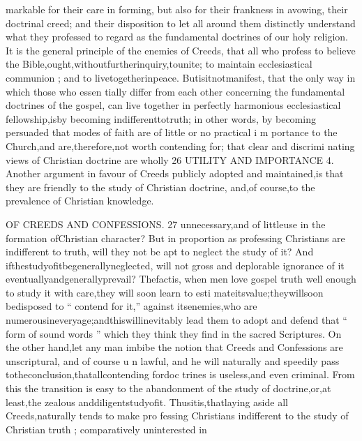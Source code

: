 \documentclass[
]{book}
\begin{document}
markable for their care in forming, but also for their frankness in avowing, their doctrinal creed; and their disposition to let all around
them distinctly understand what they professed to regard as the fundamental doctrines of our holy religion.
It is the general principle of the enemies of Creeds, that all who profess to believe the Bible,ought,withoutfurtherinquiry,tounite;
to maintain ecclesiastical communion ; and to
livetogetherinpeace. Butisitnotmanifest,
that the only way in which those who essen
tially differ from each other concerning the fundamental doctrines of the gospel, can live
together in perfectly harmonious ecclesiastical fellowship,isby becoming indifferenttotruth; in other words, by becoming persuaded that modes of faith are of little or no practical i m portance to the Church,and are,therefore,not
worth contending for; that clear and discrimi nating views of Christian doctrine are wholly
26 UTILITY AND IMPORTANCE
4. Another argument in favour of Creeds publicly adopted and maintained,is that they are friendly to the study of Christian doctrine,
and,of course,to the prevalence of Christian knowledge.

OF CREEDS AND CONFESSIONS. 27
unnecessary,and of littleuse in the formation ofChristian character? But in proportion as
professing Christians are indifferent to truth, will they not be apt to neglect the study of it? And ifthestudyofitbegenerallyneglected, will not gross and deplorable ignorance of it eventuallyandgenerallyprevail? Thefactis,
when men love gospel truth well enough to study it with care,they will soon learn to esti
mateitsvalue;theywillsoon bedisposed to
`` contend for it,'' against itsenemies,who are
numerousineveryage;andthiswillinevitably
lead them to adopt and defend that `` form of
sound words '' which they think they find in
the sacred Scriptures. On the other hand,let
any man imbibe the notion that Creeds and
Confessions are unscriptural, and of course u n
lawful, and he will naturally and speedily pass
totheconclusion,thatallcontending fordoc trines is useless,and even criminal. From
this the transition is easy to the abandonment of the study of doctrine,or,at least,the zealous
anddiligentstudyofit. Thusitis,thatlaying aside all Creeds,naturally tends to make pro fessing Christians indifferent to the study of Christian truth ; comparatively uninterested in
\end{document}

